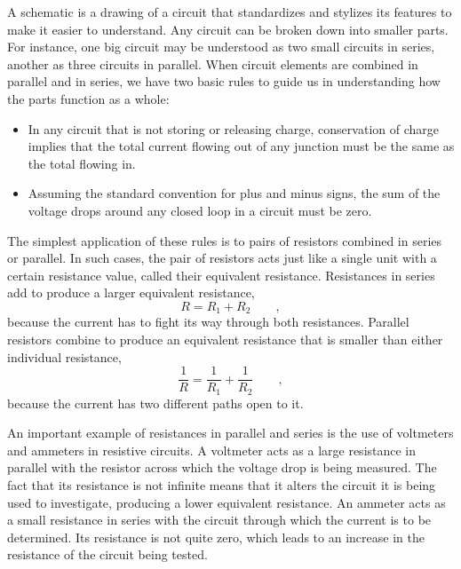 	A schematic is a drawing of a circuit that standardizes and
	stylizes its features to make it easier to understand. Any
	circuit can be broken down into smaller parts. For instance,
	one big circuit may be understood as two small circuits in
	series, another as three circuits in parallel. When circuit
	elements are combined in parallel and in series, we have two
	basic rules to guide us in understanding how the parts
	function as a whole:
	
	\begin{itemize}
	\item[]  In any circuit that is not storing or
	releasing charge, conservation of charge implies that the
	total current flowing out of any junction must be the same
	as the total flowing in.
	
	\item[]  Assuming the standard convention for plus and
	minus signs, the sum of the voltage drops around any closed
	loop in a circuit must be zero.
	\end{itemize}
	
	The simplest application of these rules is to pairs of
	resistors combined in series or parallel. In such cases, the
	pair of resistors acts just like a single unit with a
	certain resistance value, called their equivalent resistance.
	Resistances in series add to produce a larger equivalent resistance, 
	\begin{equation*}
		R = R_1+R_2 \qquad ,
	\end{equation*}
	because the current has to fight its way through both
	resistances. Parallel resistors combine to produce an
	equivalent resistance that is smaller than either individual resistance,
	\begin{equation*}
		\frac{1}{R} = \frac{1}{R_1} + \frac{1}{R_2}    \qquad   ,
	\end{equation*}
	because the current has two different paths open to it.
	
	An important example of resistances in parallel and series
	is the use of voltmeters and ammeters in resistive circuits.
	A voltmeter acts as a large resistance in parallel with the
	resistor across which the voltage drop is being measured.
	The fact that its resistance is not infinite means that it
	alters the circuit it is being used to investigate,
	producing a lower equivalent resistance. An ammeter acts as
	a small resistance in series with the circuit through which
	the current is to be determined. Its resistance is not quite
	zero, which leads to an increase in the resistance of the
	circuit being tested.

